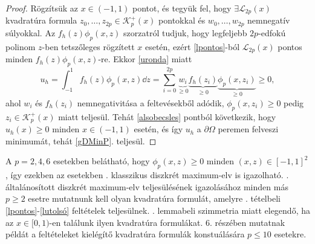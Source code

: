 \begin{proof}
	Rögzítsük az $x \in (-1,1)$ pontot, és tegyük fel, hogy $\exists \mathcal{L}_{2p}(x)$ kvadratúra formula $z_0, \ldots, z_{2p} \in \mathcal{K}_p^+(x)$ pontokkal és $w_0, \ldots, w_{2p}$ nemnegatív súlyokkal. Az  $f_h(z) \phi_p(x,z)$ szorzatról tudjuk, hogy legfeljebb $2p$-edfokú polinom $z$-ben tetszőleges rögzített $x$ esetén, ezért \ref{lpontos}-ból $\mathcal{L}_{2p}(x)$ pontos minden $f_h(z) \phi_p(x,z) $-re. Ekkor \eqref{uronda} miatt 
	\begin{equation}\label{alsobecsles}
		u_h = \int_{-1}^1 f_h(z) \phi_p(x,z) \dd z = \sum_{i = 0}^{2p} \underbrace{w_i}_{\geq 0} \underbrace{f_h(z_i)}_{\geq 0} \underbrace{\phi_p(x,z_i)}_{\geq 0} \geq 0,
	\end{equation}
	ahol $w_i$ és $f_h(z_i)$ nemnegativitása a  feltevésekből adódik, $\phi_p(x,z_i) \geq 0$ pedig $z_i \in \mathcal{K}_p^+(x)$ miatt teljesül. Tehát \eqref{alsobecsles} pontból következik, hogy $u_h(x) \geq 0$ minden $x \in (-1,1)$ esetén, és így $u_h$ a $\partial \Omega$ peremen felveszi minimumát, tehát \ref{gDMinP}. teljesül. 
	
\end{proof}

A $p=2,4,6$ esetekben belátható, hogy $\phi_p(x,z) \geq 0$ minden $(x,z) \in [-1,1]^2$,  így ezekben az esetekben . klasszikus diszkrét maximum-elv is igazolható. . általánosított diszkrét maximum-elv teljesülésének igazolásához minden más $p \geq 2$ esetre mutatnunk kell olyan kvadratúra formulát, amelyre . tételbeli \ref{lpontos}-\ref{lutolsó} feltételek teljesülnek. . lemmabeli szimmetria miatt elegendő, ha az $x\in [0,1)$-en találunk ilyen kvadratúra formulákat.  6. részében mutatnak példát a feltételeket kielégítő kvadratúra formulák konstuálására $p \leq 10$ esetekre.

